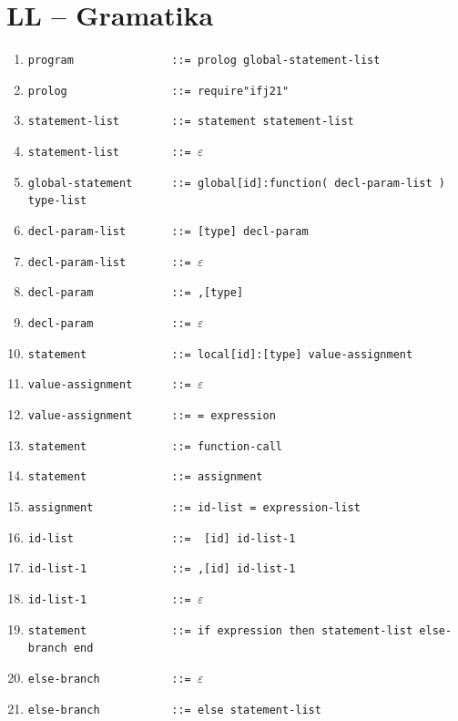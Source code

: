 \documentclass[11pt]{article}
\begin{document}
    \section{LL -- Gramatika}
        \begin{enumerate}[noitemsep]
            \normalsize
            \item\verb|program               ::= prolog global-statement-list|
            \item\verb|prolog                ::= require"ifj21"|
            \item\verb|statement-list        ::= statement statement-list|
            \item\verb|statement-list        ::= |$\varepsilon$
            \item\verb|global-statement      ::= global[id]:function( decl-param-list ) type-list|
            \item\verb|decl-param-list       ::= [type] decl-param|
            \item\verb|decl-param-list       ::= |$\varepsilon$
            \item\verb|decl-param            ::= ,[type]|
            \item\verb|decl-param            ::= |$\varepsilon$
            \item\verb|statement             ::= local[id]:[type] value-assignment|
            \item\verb|value-assignment      ::= |$\varepsilon$
            \item\verb|value-assignment      ::= = expression|
            \item\verb|statement             ::= function-call| 
            \item\verb|statement             ::= assignment| 
            \item\verb|assignment            ::= id-list = expression-list| 
            \item\verb|id-list               ::=  [id] id-list-1| 
            \item\verb|id-list-1             ::= ,[id] id-list-1| 
            \item\verb|id-list-1             ::= |$\varepsilon$ 
            \item\verb|statement             ::= if expression then statement-list else-branch end| 
            \item\verb|else-branch           ::= |$\varepsilon$ 
            \item\verb|else-branch           ::= else statement-list| 

\end{enumerate}
\end{document}
